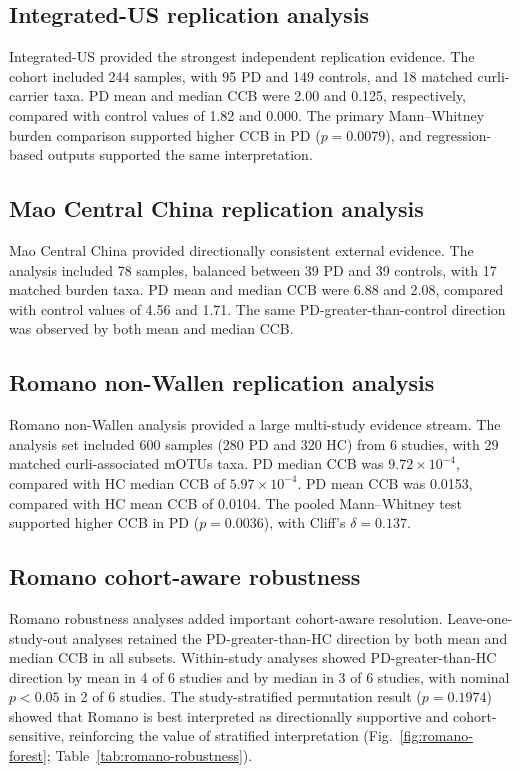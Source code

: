 \documentclass[12pt]{article}
\begin{document}
\subsection*{Integrated-US replication analysis}
Integrated-US provided the strongest independent replication evidence. The cohort included 244 samples, with 95 PD and 149 controls, and 18 matched curli-carrier taxa. PD mean and median CCB were 2.00 and 0.125, respectively, compared with control values of 1.82 and 0.000. The primary Mann--Whitney burden comparison supported higher CCB in PD ($p=0.0079$), and regression-based outputs supported the same interpretation.

\subsection*{Mao Central China replication analysis}
Mao Central China provided directionally consistent external evidence. The analysis included 78 samples, balanced between 39 PD and 39 controls, with 17 matched burden taxa. PD mean and median CCB were 6.88 and 2.08, compared with control values of 4.56 and 1.71. The same PD-greater-than-control direction was observed by both mean and median CCB.

\subsection*{Romano non-Wallen replication analysis}
Romano non-Wallen analysis provided a large multi-study evidence stream. The analysis set included 600 samples (280 PD and 320 HC) from 6 studies, with 29 matched curli-associated mOTUs taxa. PD median CCB was $9.72\times10^{-4}$, compared with HC median CCB of $5.97\times10^{-4}$. PD mean CCB was 0.0153, compared with HC mean CCB of 0.0104. The pooled Mann--Whitney test supported higher CCB in PD ($p=0.0036$), with Cliff's $\delta=0.137$.

\subsection*{Romano cohort-aware robustness}
Romano robustness analyses added important cohort-aware resolution. Leave-one-study-out analyses retained the PD-greater-than-HC direction by both mean and median CCB in all subsets. Within-study analyses showed PD-greater-than-HC direction by mean in 4 of 6 studies and by median in 3 of 6 studies, with nominal $p<0.05$ in 2 of 6 studies. The study-stratified permutation result ($p=0.1974$) showed that Romano is best interpreted as directionally supportive and cohort-sensitive, reinforcing the value of stratified interpretation (Fig.~\ref{fig:romano-forest}; Table~\ref{tab:romano-robustness}).
\end{document}
